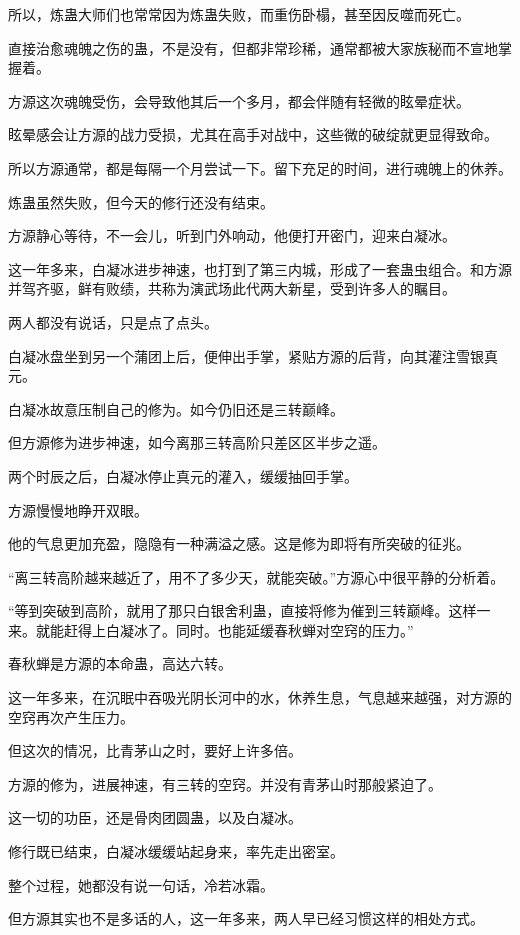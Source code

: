 \begin{this_body}
所以，炼蛊大师们也常常因为炼蛊失败，而重伤卧榻，甚至因反噬而死亡。

直接治愈魂魄之伤的蛊，不是没有，但都非常珍稀，通常都被大家族秘而不宣地掌握着。

方源这次魂魄受伤，会导致他其后一个多月，都会伴随有轻微的眩晕症状。

眩晕感会让方源的战力受损，尤其在高手对战中，这些微的破绽就更显得致命。

所以方源通常，都是每隔一个月尝试一下。留下充足的时间，进行魂魄上的休养。

炼蛊虽然失败，但今天的修行还没有结束。

方源静心等待，不一会儿，听到门外响动，他便打开密门，迎来白凝冰。

这一年多来，白凝冰进步神速，也打到了第三内城，形成了一套蛊虫组合。和方源并驾齐驱，鲜有败绩，共称为演武场此代两大新星，受到许多人的瞩目。

两人都没有说话，只是点了点头。

白凝冰盘坐到另一个蒲团上后，便伸出手掌，紧贴方源的后背，向其灌注雪银真元。

白凝冰故意压制自己的修为。如今仍旧还是三转巅峰。

但方源修为进步神速，如今离那三转高阶只差区区半步之遥。

两个时辰之后，白凝冰停止真元的灌入，缓缓抽回手掌。

方源慢慢地睁开双眼。

他的气息更加充盈，隐隐有一种满溢之感。这是修为即将有所突破的征兆。

“离三转高阶越来越近了，用不了多少天，就能突破。”方源心中很平静的分析着。

“等到突破到高阶，就用了那只白银舍利蛊，直接将修为催到三转巅峰。这样一来。就能赶得上白凝冰了。同时。也能延缓春秋蝉对空窍的压力。”

春秋蝉是方源的本命蛊，高达六转。

这一年多来，在沉眠中吞吸光阴长河中的水，休养生息，气息越来越强，对方源的空窍再次产生压力。

但这次的情况，比青茅山之时，要好上许多倍。

方源的修为，进展神速，有三转的空窍。并没有青茅山时那般紧迫了。

这一切的功臣，还是骨肉团圆蛊，以及白凝冰。

修行既已结束，白凝冰缓缓站起身来，率先走出密室。

整个过程，她都没有说一句话，冷若冰霜。

但方源其实也不是多话的人，这一年多来，两人早已经习惯这样的相处方式。


\end{this_body}
